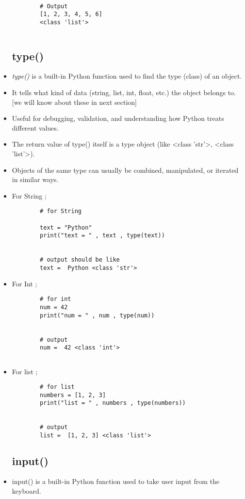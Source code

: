 \documentclass[a4paper,11pt]{article}
\theoremstyle{mytheor}
\begin{document}
\begin{itemize}
\begin{lstlisting}
		
		# Output
		[1, 2, 3, 4, 5, 6]
		<class 'list'>
		
	\end{lstlisting}
	
	\subsection{type()}
	\item \textit{type()} is a built-in Python function used to find the type (class) of an object.
	
	\item It tells what kind of data (string, list, int, float, etc.) the object belongs to. [we will know about these in next section]
	
	\item Useful for debugging, validation, and understanding how Python treats different values.
	
	\item The return value of type() itself is a type object (like <class 'str'>, <class 'list'>).
	
	\item Objects of the same type can usually be combined, manipulated, or iterated in similar ways.
	
	\item For String ;
	\begin{lstlisting}
		# for String
		
		text = "Python"
		print("text = " , text , type(text))
		
		
		# output should be like
		text =  Python <class 'str'>
	\end{lstlisting}
	\item For Int ;
	\begin{lstlisting}
		# for int
		num = 42
		print("num = " , num , type(num))
		
		
		# output
		num =  42 <class 'int'>
		
	\end{lstlisting}
	\item For list ;
	\begin{lstlisting}
		# for list
		numbers = [1, 2, 3]
		print("list = " , numbers , type(numbers))
		
		
		# output
		list =  [1, 2, 3] <class 'list'>
	\end{lstlisting}
	
	\subsection{input()}
	\item input() is a built-in Python function used to take user input from the keyboard.
	

\end{itemize}
\end{document}

